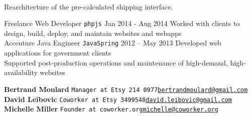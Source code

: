 \documentclass[9pt]{developercv} %
\begin{document}
\begin{entrylist}
{            \begin{minipage}[t]{0.05\textwidth}\,\end{minipage}
            \begin{minipage}[t]{0.8\textwidth}Rearchitecture of the pre-calculated shipping interface.\end{minipage}
        }
    \entry
        {Freelance}
        {Web Developer \hspace{1mm}\texttt{php}\slashsep\texttt{js}}
        {Jan 2014 - Aug 2014}
        {
            Worked with clients to design, build, deploy, and maintain websites and webapps\\
        }
    \entry
        {Accenture}
        {Java Engineer \hspace{1mm}\texttt{Java}\slashsep\texttt{Spring}}
        {2012 -- May 2013}
        {
            Developed web applications for government clients\\
            Supported post-production operations and maintenance of high-demand, high-availability websites\\
        }
\end{entrylist}


    \large\textbf{Bertrand Moulard} \slashsep \large\texttt{Manager at Etsy 214 0977\slashsep\href{mailto:bertrandmoulard@gmail.com}{bertrandmoulard@gmail.com}}\\
    \large\textbf{David Leibovic} \slashsep \large\texttt{Coworker at Etsy 3499548\slashsep\href{mailto:david.leibovic@gmail.com}{david.leibovic@gmail.com}}\\
    \large\textbf{Michelle Miller} \slashsep \large\texttt{Founder at coworker.org\slashsep\href{mailto:michelle@coworker.org}{michelle@coworker.org}}

\end{document}
